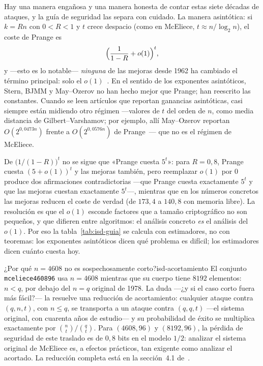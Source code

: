 Hay una manera engañosa y una manera honesta de contar estas siete
décadas de ataques, y la guía de seguridad las separa con cuidado.
La manera asintótica: si $k= Rn$ con $0<R<1$ y $t$ crece despacio
(como en McEliece, $t\approx n/\log_2 n$), el coste de Prange es
\[
  \Bigl(\frac{1}{1-R}+o(1)\Bigr)^{t},
\]
y ---esto es lo notable--- \emph{ninguna} de las mejoras desde 1962
ha cambiado el término principal: solo el $o(1)$~\cite{cmsecurity}.
En el sentido de los exponentes asintóticos, Stern, BJMM y
May--Ozerov no han hecho mejor que Prange; han reescrito las
constantes. Cuando se leen artículos que reportan ganancias
asintóticas, casi siempre están midiendo otro régimen ---valores de
$t$ del orden de $n$, como media distancia de Gilbert--Varshamov; por
ejemplo, allí May--Ozerov reportan $O(2^{0{,}0473n})$ frente a
$O(2^{0{,}0576n})$ de Prange~\cite{mo2015}--- que no es el régimen de
McEliece.

\begin{rigor}[$o(1)$ no es $0$]
De $\bigl(1/(1-R)\bigr)^{t}$ no se sigue que «Prange cuesta
$5^{t}$»: para $R=0{,}8$, Prange cuesta $(5+o(1))^{t}$ y las mejoras
también, pero reemplazar $o(1)$ por $0$ produce dos afirmaciones
contradictorias ---que Prange cuesta exactamente $5^{t}$ y que las
mejoras cuestan exactamente $5^{t}$---, mientras que en los números
concretos las mejoras reducen el coste de verdad (de $173{,}4$ a
$140{,}8$ con memoria libre). La resolución es que el $o(1)$ esconde
factores que a tamaño criptográfico no son pequeños, y que difieren
entre algoritmos: el análisis concreto \emph{es} el análisis del
$o(1)$. Por eso la tabla~\ref{tab:isd-guia} se calcula con
estimadores, no con teoremas: los exponentes asintóticos dicen qué
problema es difícil; los estimadores dicen cuánto cuesta hoy.
\end{rigor}

\begin{observacion}{¿Por qué $n=4608$ no es sospechosamente corto?}{isd-acortamiento}
El conjunto \texttt{mceliece460896} usa $n=4608$ mientras que su
cuerpo tiene $8192$ elementos: $n<q$, por debajo del $n=q$ original
de 1978. La duda ---¿y si el caso corto fuera más fácil?--- la
resuelve una reducción de acortamiento: cualquier ataque contra
$(q,n,t)$, con $n\le q$, se transporta a un ataque contra
$(q,q,t)$ ---el sistema original, con cuarenta años de estudio--- y
su probabilidad de éxito se multiplica exactamente por
$\binom{n}{t}/\binom{q}{t}$. Para $(4608,96)$ y $(8192,96)$, la
pérdida de seguridad de este traslado es de $0{,}8$ bits en el
modelo $1/2$: analizar el sistema original de McEliece es, a efectos
prácticos, tan exigente como analizar el acortado. La reducción
completa está en la sección~4.1 de~\cite{cmsecurity}.
\end{observacion}

